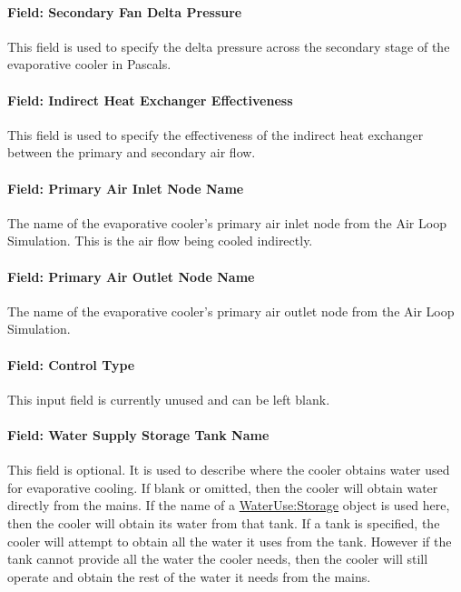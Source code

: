 \paragraph{Field: Secondary Fan Delta Pressure}\label{field-secondary-fan-delta-pressure}

This field is used to specify the delta pressure across the secondary stage of the evaporative cooler in Pascals.

\paragraph{Field: Indirect Heat Exchanger Effectiveness}\label{field-indirect-heat-exchanger-effectiveness}

This field is used to specify the effectiveness of the indirect heat exchanger between the primary and secondary air flow.

\paragraph{Field: Primary Air Inlet Node Name}\label{field-primary-air-inlet-node-name-000}

The name of the evaporative cooler's primary air inlet node from the Air Loop Simulation. This is the air flow being cooled indirectly.

\paragraph{Field: Primary Air Outlet Node Name}\label{field-primary-air-outlet-node-name-000}

The name of the evaporative cooler's primary air outlet node from the Air Loop Simulation.

\paragraph{Field: Control Type}\label{field-control-type-1}

This input field is currently unused and can be left blank.

\paragraph{Field: Water Supply Storage Tank Name}\label{field-water-supply-storage-tank-name-2}

This field is optional. It is used to describe where the cooler obtains water used for evaporative cooling. If blank or omitted, then the cooler will obtain water directly from the mains. If the name of a \hyperref[waterusestorage]{WaterUse:Storage} object is used here, then the cooler will obtain its water from that tank. If a tank is specified, the cooler will attempt to obtain all the water it uses from the tank. However if the tank cannot provide all the water the cooler needs, then the cooler will still operate and obtain the rest of the water it needs from the mains.

